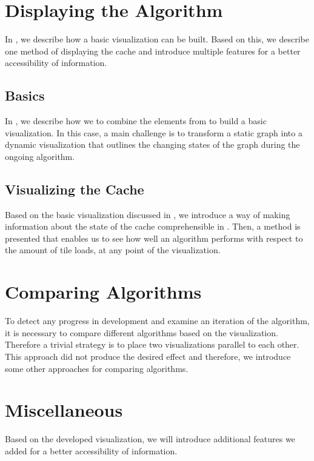 \documentclass
[
    paper = a4,
    pagesize,
    12 pt,
    twoside,                       %
    open = right,
    DIV = calc,
    BCOR = 0 mm,                   %
    bibtotoc
]
{scrbook}
\begin{document}
\section{Displaying the Algorithm}

In , we describe how a basic visualization can be built.
Based on this, we describe one method of displaying the cache and introduce multiple features for a better accessibility of information.


\subsection{Basics}

In , we describe how we to combine the elements from  to build a basic visualization.
In this case, a main challenge is to transform a static graph into a dynamic visualization that outlines the changing states of the graph during the ongoing algorithm.


\subsection{Visualizing the Cache} \label{pre_cache}

Based on the basic visualization discussed in , we introduce a way of making information about the state of the cache comprehensible in .
Then, a method is presented that enables us to see how well an algorithm performs with respect to the amount of tile loads, at any point of the visualization.


\section{Comparing Algorithms}

To detect any progress in development and examine an iteration of the algorithm, it is necessary to compare different algorithms based on the visualization.
Therefore a trivial strategy is to place two visualizations parallel to each other.
This approach did not produce the desired effect and therefore, we introduce some other approaches for comparing algorithms.


\section{Miscellaneous}

Based on the developed visualization, we will introduce additional features we added for a better accessibility of information.
\end{document}

